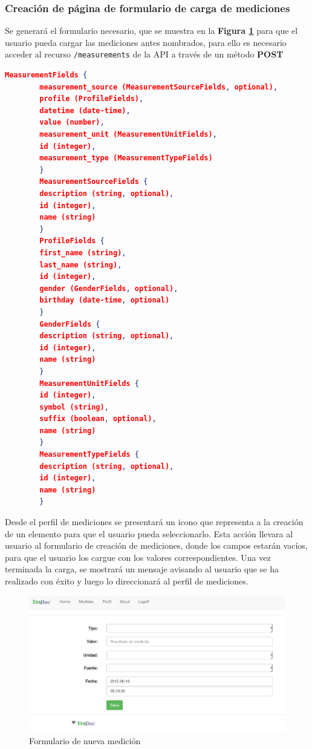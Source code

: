 \subsubsection{ Creación de página de formulario de carga de mediciones}
Se generará el formulario necesario, que se muestra en la \textbf{Figura \ref{nueva_medicion}} para que el usuario pueda cargar las mediciones antes nombrados, para ello es necesario acceder al recurso \texttt{/measurements} de la API a través de un método \textbf{POST}

      \begin{lstlisting}[language=json,firstnumber=1]
         MeasurementFields {
        measurement_source (MeasurementSourceFields, optional),
        profile (ProfileFields),
        datetime (date-time),
        value (number),
        measurement_unit (MeasurementUnitFields),
        id (integer),
        measurement_type (MeasurementTypeFields)
        }
        MeasurementSourceFields {
        description (string, optional),
        id (integer),
        name (string)
        }
        ProfileFields {
        first_name (string),
        last_name (string),
        id (integer),
        gender (GenderFields, optional),
        birthday (date-time, optional)
        }
        GenderFields {
        description (string, optional),
        id (integer),
        name (string)
        }
        MeasurementUnitFields {
        id (integer),
        symbol (string),
        suffix (boolean, optional),
        name (string)
        }
        MeasurementTypeFields {
        description (string, optional),
        id (integer),
        name (string)
        } 
    \end{lstlisting}
    
Desde el perfil de mediciones se presentará un icono que representa a la creación de un elemento para que el usuario pueda seleccionarlo. Esta acción llevara al usuario al formulario de creación de mediciones, donde los campos estarán vacíos, para que el usuario los cargue con los valores correspondientes. Una vez terminada la carga, se mostrará un mensaje avisando al usuario que se ha realizado con éxito y luego lo direccionará al perfil de mediciones.
    
    \begin{figure}[h]
        \centering
        \includegraphics[width=1\textwidth]{img/2-nueva_medicion}
        \caption{Formulario de nueva medición}
		\label{nueva_medicion}
    \end{figure}
